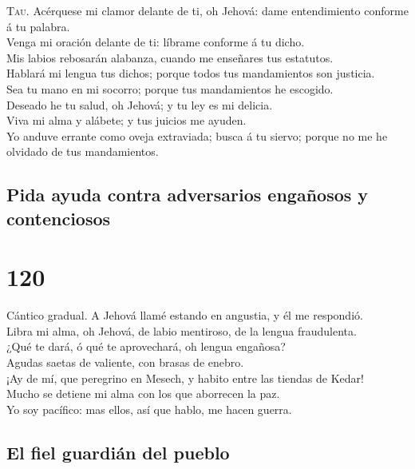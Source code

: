  \textsc{Tau}. Acérquese mi clamor delante de ti, oh
Jehová: dame entendimiento conforme á tu palabra.\\
 Venga mi oración delante de ti: líbrame conforme á tu
dicho.\\
 Mis labios rebosarán alabanza, cuando me enseñares tus
estatutos.\\
 Hablará mi lengua tus dichos; porque todos tus
mandamientos son justicia.\\
 Sea tu mano en mi socorro; porque tus mandamientos he
escogido.\\
 Deseado he tu salud, oh Jehová; y tu ley es mi
delicia.\\
 Viva mi alma y alábete; y tus juicios me ayuden.\\
 Yo anduve errante como oveja extraviada; busca á tu
siervo; porque no me he olvidado de tus mandamientos.

\hypertarget{pida-ayuda-contra-adversarios-engauxf1osos-y-contenciosos}{%
\subsection{Pida ayuda contra adversarios engañosos y
contenciosos}\label{pida-ayuda-contra-adversarios-engauxf1osos-y-contenciosos}}

\hypertarget{section-119}{%
\section{120}\label{section-119}}

 Cántico gradual. A Jehová llamé estando en angustia, y él
me respondió.\\
 Libra mi alma, oh Jehová, de labio mentiroso, de la
lengua fraudulenta.\\
 ¿Qué te dará, ó qué te aprovechará, oh lengua engañosa?\\
 Agudas saetas de valiente, con brasas de enebro.\\
 ¡Ay de mí, que peregrino en Mesech, y habito entre las
tiendas de Kedar!\\
 Mucho se detiene mi alma con los que aborrecen la paz.\\
 Yo soy pacífico: mas ellos, así que hablo, me hacen
guerra.

\hypertarget{el-fiel-guardiuxe1n-del-pueblo}{%
\subsection{El fiel guardián del
pueblo}\label{el-fiel-guardiuxe1n-del-pueblo}}

